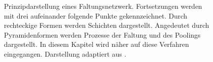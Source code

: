 \begin{figure}[H]
\begin{tikzpicture}
				
			\end{tikzpicture}
			\caption{Prinzipdarstellung eines Faltungsnetzwerk. Fortsetzungen werden mit drei aufeinander folgende Punkte gekennzeichnet. Durch rechteckige Formen werden Schichten dargestellt. Angedeutet durch Pyramidenformen werden Prozesse der Faltung und des Poolings dargestellt. In diesem Kapitel wird näher auf diese Verfahren eingegangen. Darstellung adaptiert aus \cite{carpng} \cite{todasc}.}
			\label{fig: depthwise conv }
		\end{figure}